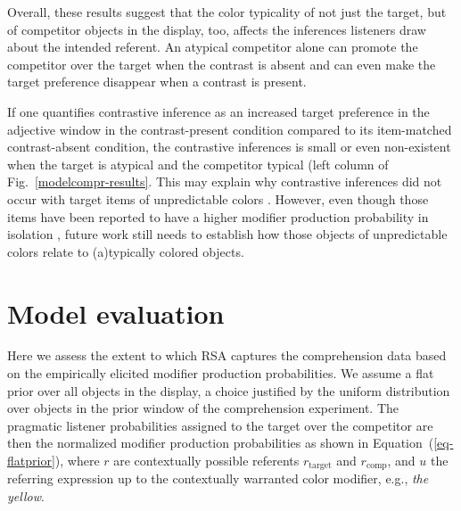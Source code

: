 \documentclass[10pt,letterpaper]{article}
\newcommand{\figref}[1]{Fig.~\ref{#1}}
\begin{document}

Overall, these results suggest that the color typicality of not just the target, but of competitor objects in the display, too, affects the inferences listeners draw about the intended referent. An atypical competitor alone can promote the competitor over the target when the contrast is absent and can even make the target preference disappear when a contrast is present. %

If one quantifies contrastive inference as an increased target preference in the adjective window in the contrast-present condition compared to its item-matched contrast-absent condition, the contrastive inferences is small or even non-existent when the target is atypical and the competitor typical (left column of \figref{modelcompr-results}. This may explain why contrastive inferences did not occur with target items of unpredictable colors \cite{Sedivy:2003}. However, even though those items have been reported to have a higher modifier production probability in isolation \cite{Sedivy:2003}, future work still needs to establish how those objects of unpredictable colors relate to (a)typically colored objects.

\section{Model evaluation}

Here we assess the extent to which RSA captures the comprehension data based on the empirically elicited modifier production probabilities. We assume a flat prior over all objects in the display, a choice justified by the uniform distribution over objects in the prior window of the comprehension experiment. The pragmatic listener probabilities assigned to the target over the competitor are then the normalized modifier production probabilities as shown in Equation~(\ref{eq-flatprior}), where $r$ are contextually possible referents $r_{\text{target}}$ and $r_{\text{comp}}$, and $u$ the referring expression up to the contextually warranted color modifier, e.g., \emph{the yellow}.
\end{document}
